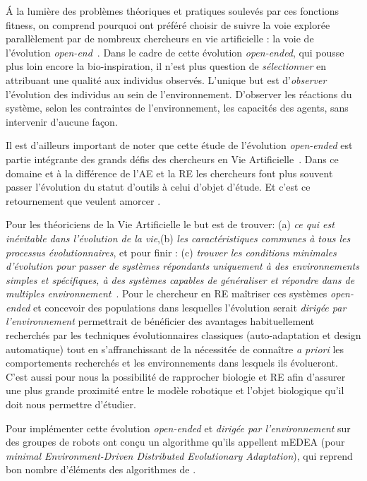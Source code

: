 \'A la lumière des problèmes théoriques et pratiques soulevés par ces fonctions fitness, on comprend pourquoi \cite{bredeche2012environmentdrivenopenende} ont préféré choisir de suivre la voie explorée parallèlement par de nombreux chercheurs en vie artificielle : la voie de l'évolution \emph{open-end}~\citep{ray91anapproachtothesynthesisoflife,adami94evolutionarylearninginthe2Dartificiallifesystemavida}. Dans le cadre de cette évolution \emph{open-ended}, qui pousse plus loin encore la bio-inspiration, il n'est plus question de \emph{sélectionner} en attribuant une qualité aux individus observés. L'unique but est d'\emph{observer} l'évolution des individus au sein de l'environnement. D'observer les réactions du système, selon les contraintes de l'environnement, les capacités des agents, sans intervenir d'aucune fa\c con.

Il est d'ailleurs important de noter que cette étude de l'évolution \emph{open-ended} est partie intégrante des grands défis des chercheurs en Vie Artificielle~\citep{bedau2000openproblemsinartificiallife}. Dans ce domaine et à la différence de l'AE et la RE les chercheurs font plus souvent passer l'évolution du statut d'outils à celui d'objet d'étude. Et c'est ce retournement que veulent amorcer \cite{bredeche11mcmds}.

Pour les théoriciens de la Vie Artificielle le but est de trouver: (a) \emph{ce qui est inévitable dans l'évolution de la vie},(b) \emph{les caractéristiques communes à tous les processus évolutionnaires}, et pour finir : (c) \emph{trouver les conditions minimales d'évolution pour passer de systèmes répondants uniquement à des environnements simples et spécifiques, à des systèmes capables de généraliser et répondre dans de multiples environnement}~\citep[voir respectivement les chapitres 3.6, 3.10 et 3.7 ]{bedau2000openproblemsinartificiallife}.
Pour le chercheur en RE maîtriser ces systèmes \emph{open-ended} et concevoir des populations dans lesquelles l'évolution serait \emph{dirigée par l'environnement} permettrait de bénéficier des avantages habituellement recherchés par les techniques évolutionnaires classiques (auto-adaptation et design automatique) tout en s'affranchissant de la nécessitée de connaître \emph{a priori} les comportements recherchés et les environnements dans lesquels ils évolueront. C'est aussi pour nous la possibilité de rapprocher biologie et RE afin d'assurer une plus grande proximité entre le modèle robotique et l'objet biologique qu'il doit nous permettre d'étudier.

Pour implémenter cette évolution \emph{open-ended} et \emph{dirigée par l'environnement} sur des groupes de robots \cite{bredeche11mcmds} ont conçu un algorithme qu'ils appellent mEDEA (pour \emph{minimal Environment-Driven Distributed Evolutionary Adaptation}), qui reprend bon nombre d'éléments des algorithmes de \cite{watson02embodiedevolutiondistributingevolutionaryalgorithmpopulationrobots}. 

